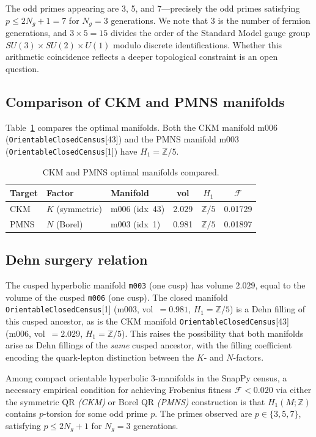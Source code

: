 The odd primes appearing are 3, 5, and 7---precisely the odd primes
satisfying $p \leq 2N_g + 1 = 7$ for $N_g = 3$ generations.
We note that 3 is the number of fermion generations, and
$3 \times 5 = 15$ divides the order of the Standard Model gauge group
$SU(3)\times SU(2)\times U(1)$ modulo discrete identifications.
Whether this arithmetic coincidence reflects a deeper topological
constraint is an open question.

\subsection{Comparison of CKM and PMNS manifolds}

Table~\ref{tab:ckm_pmns_compare} compares the optimal manifolds.
Both the CKM manifold m006 (\texttt{OrientableClosedCensus}[43])
and the PMNS manifold m003 (\texttt{OrientableClosedCensus}[1])
have $H_1 = \mathbb{Z}/5$.

\begin{table}[h]
\centering
\caption{CKM and PMNS optimal manifolds compared.}
\label{tab:ckm_pmns_compare}
\begin{tabular}{lllccc}
\toprule
Target & Factor & Manifold & vol & $H_1$ & $\mathcal{F}$ \\
\midrule
CKM  & $K$ (symmetric) & m006 (idx~43) & 2.029 & $\mathbb{Z}/5$ & 0.01729 \\
PMNS & $N$ (Borel)     & m003 (idx~1)  & 0.981 & $\mathbb{Z}/5$ & 0.01897 \\
\bottomrule
\end{tabular}
\end{table}

\subsection{Dehn surgery relation}

The cusped hyperbolic manifold \texttt{m003} (one cusp) has volume
$2.029$, equal to the volume of the cusped \texttt{m006} (one cusp).
The closed manifold \texttt{OrientableClosedCensus}[1] (m003,
vol~$= 0.981$, $H_1 = \mathbb{Z}/5$) is a Dehn filling of this
cusped ancestor, as is the CKM manifold
\texttt{OrientableClosedCensus}[43] (m006, vol~$= 2.029$,
$H_1 = \mathbb{Z}/5$). This raises the possibility that both
manifolds arise as Dehn fillings of the \emph{same} cusped ancestor,
with the filling coefficient encoding the quark-lepton distinction
between the $K$- and $N$-factors.

\begin{proposition}
\label{prop:oddtorsion}
Among compact orientable hyperbolic 3-manifolds in the SnapPy census,
a necessary empirical condition for achieving Frobenius fitness
$\mathcal{F} < 0.020$ via either the symmetric QR \emph{(CKM)} or
Borel QR \emph{(PMNS)} construction is that $H_1(M;\mathbb{Z})$
contains $p$-torsion for some odd prime $p$.
The primes observed are $p \in \{3, 5, 7\}$, satisfying
$p \leq 2N_g + 1$ for $N_g = 3$ generations.
\end{proposition}

